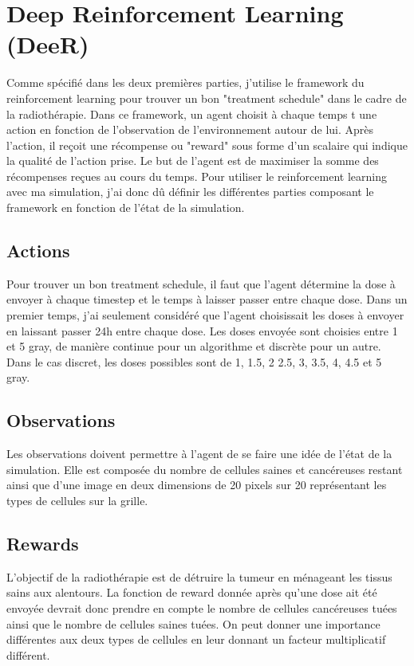 \documentclass[12pt]{article}
\begin{document}
\section{Deep Reinforcement Learning (DeeR)}
Comme spécifié dans les deux premières parties, j'utilise le framework du reinforcement learning pour trouver un bon "treatment schedule" dans le cadre de la radiothérapie. Dans ce framework, un agent choisit à chaque temps t une action en fonction de l'observation de l'environnement autour de lui. Après l'action, il reçoit une récompense ou "reward" sous forme d'un scalaire qui indique la qualité de l'action prise. Le but de l'agent est de maximiser la somme des récompenses reçues au cours du temps. Pour utiliser le reinforcement learning avec ma simulation, j'ai donc dû définir les différentes parties composant le framework en fonction de l'état de la simulation.
\subsection{Actions}
Pour trouver un bon treatment schedule, il faut que l'agent détermine la dose à envoyer à chaque timestep et le temps à laisser passer entre chaque dose. Dans un premier temps, j'ai seulement considéré que l'agent choisissait les doses à envoyer en laissant passer 24h entre chaque dose. Les doses envoyée sont choisies entre 1 et 5 gray, de manière continue pour un algorithme et discrète pour un autre. Dans le cas discret, les doses possibles sont de 1, 1.5, 2 2.5, 3, 3.5, 4, 4.5 et 5 gray.
\subsection{Observations}
Les observations doivent permettre à l'agent de se faire une idée de l'état de la simulation. Elle est composée du nombre de cellules saines et cancéreuses restant ainsi que d'une image en deux dimensions de 20 pixels sur 20 représentant les types de cellules sur la grille.
\subsection{Rewards}
L'objectif de la radiothérapie est de détruire la tumeur en ménageant les tissus sains aux alentours. La fonction de reward donnée après qu'une dose ait été envoyée devrait donc prendre en compte le nombre de cellules cancéreuses tuées ainsi que le nombre de cellules saines tuées. On peut donner une importance différentes aux deux types de cellules en leur donnant un facteur multiplicatif différent.
\end{document}
